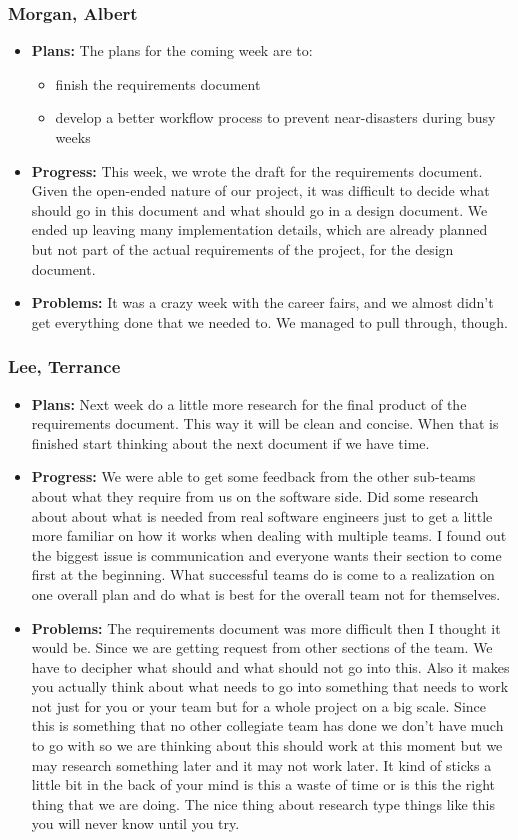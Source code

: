 \documentclass[10pt,draftclsnofoot,onecolumn]{IEEEtran}
\begin{document}
\subsubsection{Morgan, Albert}
\begin{itemize}
	\item \textbf{Plans: }
	The plans for the coming week are to:
	\begin{itemize}
		\item finish the requirements document
		\item develop a better workflow process to prevent near-disasters during busy weeks
	\end{itemize}
	\item \textbf{Progress: }
	This week, we wrote the draft for the requirements document. Given the open-ended nature of our project, it was difficult to decide what should go in this document and what should go in a design document. We ended up leaving many implementation details, which are already planned but not part of the actual requirements of the project, for the design document.
	\item \textbf{Problems: }
	It was a crazy week with the career fairs, and we almost didn't get everything done that we needed to. We managed to pull through, though.
\end{itemize}
\subsubsection{Lee, Terrance}
\begin{itemize}
	\item \textbf{Plans:}
	Next week do a little more research for the final product of the requirements document. This way it will be clean and concise. When that is finished start thinking about the next document if we have time.
	\item \textbf{Progress:}
	We were able to get some feedback from the other sub-teams about what they require from us on the software side. Did some research about about what is needed from real software engineers just to get a little more familiar on how it works when dealing with multiple teams. I found out the biggest issue is communication and everyone wants their section to come first at the beginning. What successful teams do is come to a realization on one overall plan and do what is best for the overall team not for themselves.
	\item \textbf{Problems:}
	The requirements document was more difficult then I thought it would be. Since we are getting request from other sections of the team. We have to decipher what should and what should not go into this. Also it makes you actually think about what needs to go into something that needs to work not just for you or your team but for a whole project on a big scale. Since this is something that no other collegiate team has done we don't have much to go with so we are thinking about this should work at this moment but we may research something later and it may not work later. It kind of sticks a little bit in the back of your mind is this a waste of time or is this the right thing that we are doing. The nice thing about research type things like this you will never know until you try.
\end{itemize}
\end{document}
